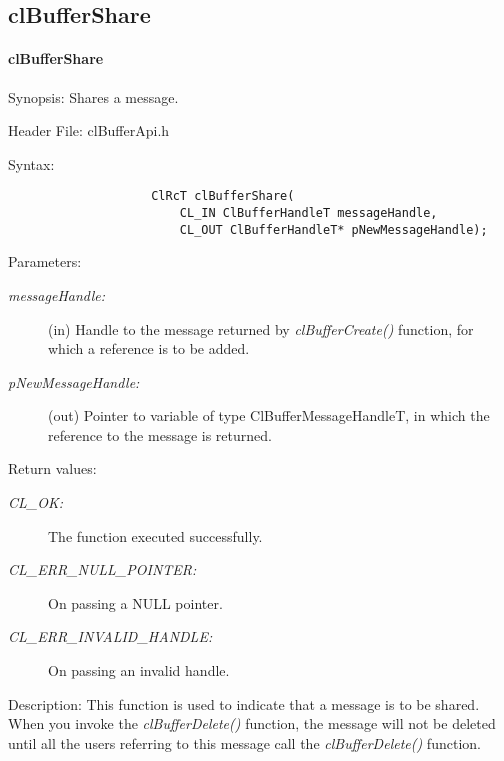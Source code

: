 \subsection{clBufferShare}
\hypertarget{pagebuf128}{}\paragraph{cl\-Buffer\-Share}\label{pagebuf128}
\begin{Desc}
\item[Synopsis:]Shares a message.\end{Desc}
\begin{Desc}
\item[Header File:]clBufferApi.h\end{Desc}
\begin{Desc}
\item[Syntax:]

\footnotesize\begin{verbatim}   
					ClRcT clBufferShare(
						CL_IN ClBufferHandleT messageHandle,
						CL_OUT ClBufferHandleT* pNewMessageHandle);
\end{verbatim}
\normalsize
\end{Desc}
\begin{Desc}
\item[Parameters:]
\begin{description}
\item[{\em message\-Handle:}](in) Handle to the message returned by \textit{clBufferCreate()} function, for which a reference is to be added. 
\item[{\em p\-New\-Message\-Handle:}](out) Pointer to variable of type Cl\-Buffer\-Message\-Handle\-T, in which the reference to the message is returned.\end{description}
\end{Desc}
\begin{Desc}
\item[Return values:]
\begin{description}
\item[{\em CL\_\-OK:}]The function executed successfully. \item[{\em CL\_\-ERR\_\-NULL\_\-POINTER:}]On passing a NULL pointer. \item[{\em CL\_\-ERR\_\-INVALID\_\-HANDLE:}]On passing an invalid handle.\end{description}
\end{Desc}
\begin{Desc}
\item[Description:]This function is used to indicate that a message is to be shared. When you invoke the 
\textit{clBufferDelete()} function, the message will not be deleted until all the users referring to this message
call the \textit{clBufferDelete()} function.\end{Desc}

